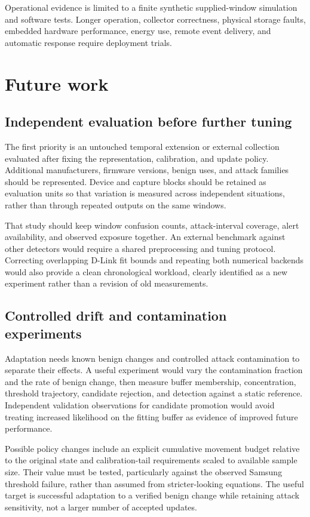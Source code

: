 Operational evidence is limited to a finite synthetic supplied-window
simulation and software tests. Longer operation, collector correctness,
physical storage faults, embedded hardware performance, energy use, remote
event delivery, and automatic response require deployment trials.

\section{Future work}
\label{sec:future-work}

\subsection{Independent evaluation before further tuning}

The first priority is an untouched temporal extension or external
collection evaluated after fixing the representation, calibration,
and update policy. Additional manufacturers, firmware versions,
benign uses, and attack families should be represented. Device and
capture blocks should be retained as evaluation units so that
variation is measured across independent situations, rather than
through repeated outputs on the same windows.

That study should keep window confusion counts, attack-interval
coverage, alert availability, and observed exposure together.
An external benchmark against other detectors would require a
shared preprocessing and tuning protocol. Correcting overlapping
D-Link fit bounds and repeating both numerical backends would also
provide a clean chronological workload, clearly identified as a
new experiment rather than a revision of old measurements.

\subsection{Controlled drift and contamination experiments}

Adaptation needs known benign changes and controlled attack
contamination to separate their effects. A useful experiment would
vary the contamination fraction and the rate of benign change,
then measure buffer membership, concentration, threshold trajectory,
candidate rejection, and detection against a static reference.
Independent validation observations for candidate promotion would
avoid treating increased likelihood on the fitting buffer as
evidence of improved future performance.

Possible policy changes include an explicit cumulative movement
budget relative to the original state and calibration-tail
requirements scaled to available sample size. Their value must
be tested, particularly against the observed Samsung threshold
failure, rather than assumed from stricter-looking equations.
The useful target is successful adaptation to a verified benign
change while retaining attack sensitivity, not a larger number
of accepted updates.

